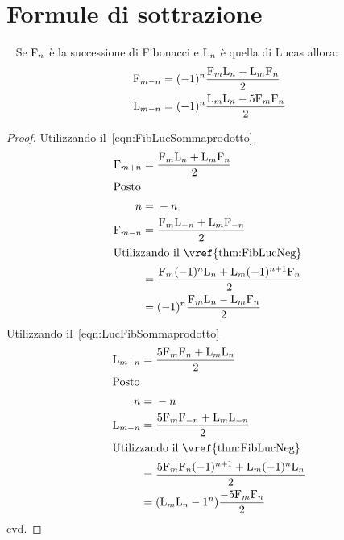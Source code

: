 \section{Formule di sottrazione}
\begin{thm}~\cite{Rabinowitz_1996}\label{thm:FibLucFormSottazione}
	Se $\mathrm{F}_{n}$ è la successione di Fibonacci e  $\mathrm{L}_{n}$ è quella di Lucas 
allora:
\begin{align}
	\mathrm{F}_{m-n}={}&{}(-1)^n\dfrac{\mathrm{F}_{m}\mathrm{L}_{n}-\mathrm{L}_{m}\mathrm{F}_{n}}{2}\\
	\mathrm{L}_{m-n}={}&{}(-1)^n\dfrac{\mathrm{L}_{m}\mathrm{L}_{n}-5\mathrm{F}_{m}\mathrm{F}_{n}}{2}
\end{align}
\end{thm}
\begin{proof}
Utilizzando il~\vref{eqn:FibLucSommaprodotto}
\begin{align*}
	\Fib{m+n}={}&{}\dfrac{\Fib{m}\Luc{n}+\Luc{m}\Fib{n}}{2}\\
\intertext{Posto}
n={}&{}-n\\
\Fib{m-n}={}&{}\dfrac{\Fib{m}\Luc{-n}+\Luc{m}\Fib{-n}}{2}\\
\intertext{Utilizzando il~\vref{thm:FibLucNeg} }
={}&{}\dfrac{\Fib{m}(-1)^n\Luc{n}+\Luc{m}(-1)^{n+1}\Fib{n}}{2}\\
={}&{}(-1)^n\dfrac{\Fib{m}\Luc{n}-\Luc{m}\Fib{n}}{2}
\end{align*}
Utilizzando il~\vref{eqn:LucFibSommaprodotto}
\begin{align*}
\Luc{m+n}={}&{}\dfrac{5\Fib{m}\Fib{n}+\Luc{m}\Luc{n}}{2}\\
\intertext{Posto}
n={}&{}-n\\
\Luc{m-n}={}&{}\dfrac{5\Fib{m}\Fib{-n}+\Luc{m}\Luc{-n}}{2}\\
\intertext{Utilizzando il~\vref{thm:FibLucNeg} }
={}&{}\dfrac{5\Fib{m}\Fib{n}(-1)^{n+1}+\Luc{m}(-1)^n\Luc{n}}{2}\\
={}&{}(\Luc{m}\Luc{n}-1^n)\dfrac{-5\Fib{m}\Fib{n}}{2}\\
\end{align*}
cvd.
\end{proof}
